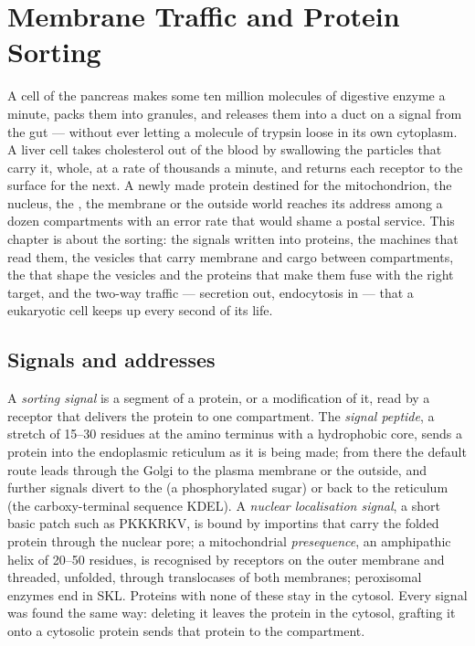 \chapter{Membrane Traffic and Protein Sorting}\label{ch:b3:membrane-traffic}

A cell of the pancreas makes some ten million molecules of digestive
enzyme a minute, packs them into granules, and releases them into a
duct on a signal from the gut --- without ever letting a molecule of
trypsin loose in its own cytoplasm. A liver cell takes cholesterol out
of the blood by swallowing the particles that carry it, whole, at a
rate of thousands a minute, and returns each receptor to the surface
for the next. A newly made protein destined for the mitochondrion, the
nucleus, the , the membrane or the outside world reaches its
address among a dozen compartments with an error rate that would
shame a postal service. This chapter is about the sorting: the signals
written into proteins, the machines that read them, the vesicles that
carry membrane and cargo between compartments, the  that shape the
vesicles and the proteins that make them fuse with the right target, and
the two-way traffic --- secretion out, endocytosis in --- that a
eukaryotic cell keeps up every second of its life.

\section{Signals and addresses}

\begin{definition}\label{def:b3:membrane-traffic:signals}
A \emph{sorting signal} is a segment of a protein, or a modification of
it, read by a receptor that delivers the protein to one compartment.
The \emph{signal peptide}, a stretch of \numrange{15}{30} residues at
the amino terminus with a hydrophobic core, sends a protein into the
endoplasmic reticulum as it is being made; from there the default
route leads through the Golgi to the plasma membrane or the outside,
and further signals divert to the  (a phosphorylated sugar) or
back to the reticulum (the carboxy-terminal sequence KDEL). A
\emph{nuclear localisation signal}, a short basic patch such as
PKKKRKV, is bound by importins that carry the folded protein through
the nuclear pore; a mitochondrial \emph{presequence}, an amphipathic
helix of \numrange{20}{50} residues, is recognised by receptors on the
outer membrane and threaded, unfolded, through translocases of both
membranes; peroxisomal enzymes end in SKL. Proteins with none of these
stay in the cytosol. Every signal was found the same way: deleting it
leaves the protein in the cytosol, grafting it onto a cytosolic protein
sends that protein to the compartment.
\end{definition}

